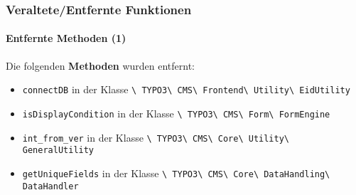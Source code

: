 \begin{frame}[fragile]
	\frametitle{Veraltete/Entfernte Funktionen}
	\framesubtitle{Entfernte Methoden (1)}

	Die folgenden \textbf{Methoden} wurden entfernt:

	\begin{itemize}
		\item
			\small
				\texttt{connectDB}\newline
				in der Klasse
				\texttt{\textbackslash
					TYPO3\textbackslash
					CMS\textbackslash
					Frontend\textbackslash
					Utility\textbackslash
					EidUtility}
			\normalsize
		\item
			\small
				\texttt{isDisplayCondition}\newline
				in der Klasse
				\texttt{\textbackslash
					TYPO3\textbackslash
					CMS\textbackslash
					Form\textbackslash
					FormEngine}
			\normalsize
		\item
			\small
				\texttt{int\_from\_ver}\newline
				in der Klasse
				\texttt{\textbackslash
					TYPO3\textbackslash
					CMS\textbackslash
					Core\textbackslash
					Utility\textbackslash
					GeneralUtility}
			\normalsize
		\item
			\small
				\texttt{getUniqueFields}\newline
				in der Klasse
				\texttt{\textbackslash
					TYPO3\textbackslash
					CMS\textbackslash
					Core\textbackslash
					DataHandling\textbackslash
					DataHandler}
			\normalsize

	\end{itemize}

\end{frame}



